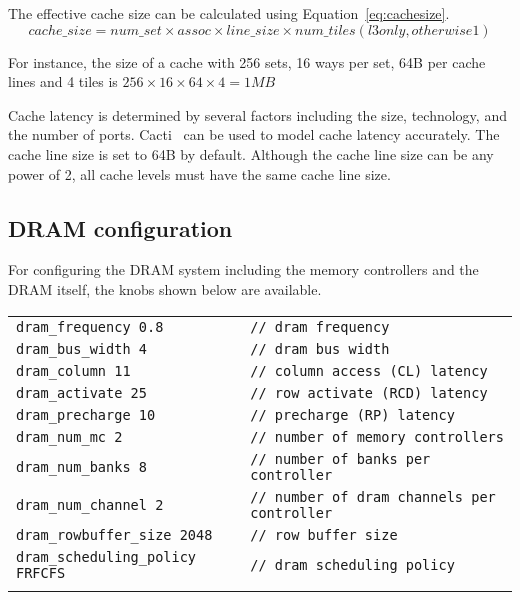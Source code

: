 \noindent The effective cache size can be calculated using Equation~\ref{eq:cachesize}.
\begin{equation}
\label{eq:cachesize}
cache\_size = num\_set \times assoc \times line\_size \times num\_tiles (l3 only, otherwise 1)
\end{equation}


\noindent For instance, the size of a cache with 256 sets, 16 ways per set, 64B per cache lines and 4
tiles is $256 \times 16 \times 64 \times 4 = 1\textit{MB}$

Cache latency is determined by several factors including the
size, technology, and the number of ports. Cacti~\cite{cacti} can be
used to model cache latency accurately. The cache line size is set to
64B by default. Although the cache line size can be any power of 2,
all cache levels must have the same cache line size.


\subsection{DRAM configuration}
\label{sec:param-dram}

For configuring the DRAM system including the memory controllers and the DRAM
itself, the knobs shown below are available. 

\begin{tabular}{l l}
 \\
 \Verb+dram_frequency 0.8+ & \Verb+// dram frequency+ \\
 \Verb+dram_bus_width 4 + & \Verb+// dram bus width+ \\
 \Verb+dram_column 11+ & \Verb+// column access (CL) latency+ \\
 \Verb+dram_activate 25 + & \Verb+// row activate (RCD) latency+ \\
 \Verb+dram_precharge 10+ & \Verb+// precharge (RP) latency+ \\
 \Verb+dram_num_mc 2 + & \Verb+// number of memory controllers+ \\
 \Verb+dram_num_banks 8+ & \Verb+// number of banks per controller+ \\
 \Verb+dram_num_channel 2 + & \Verb+// number of dram channels per controller+ \\
 \Verb+dram_rowbuffer_size 2048 + & \Verb+// row buffer size+ \\
 \Verb+dram_scheduling_policy FRFCFS+ & \Verb+// dram scheduling policy+ \\
 \\
\end{tabular}

